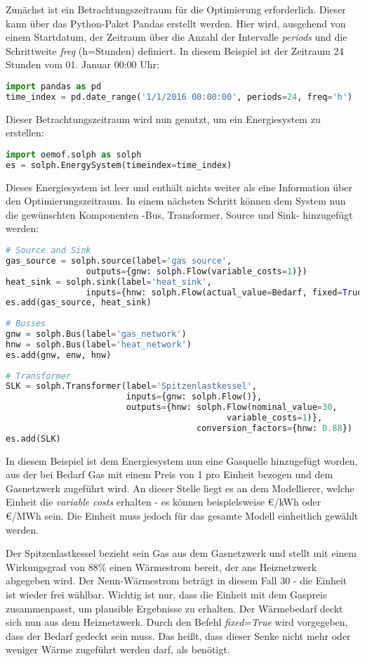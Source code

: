 Zunächst ist ein Betrachtungszeitraum für die Optimierung erforderlich. Dieser kann über das Python-Paket Pandas erstellt werden. Hier wird, ausgehend von einem Startdatum, der Zeitraum über die Anzahl der Intervalle \textit{periods} und die Schrittweite \textit{freq} (h=Stunden) definiert. In diesem Beispiel ist der Zeitraum 24 Stunden vom 01. Januar 00:00 Uhr:
\begin{lstlisting}[language=python,numbers=none]
import pandas as pd
time_index = pd.date_range('1/1/2016 00:00:00', periods=24, freq='h')
\end{lstlisting}
Dieser Betrachtungszeitraum wird nun genutzt, um ein Energiesystem zu erstellen:
\begin{lstlisting}[language=python,numbers=none]
import oemof.solph as solph
es = solph.EnergySystem(timeindex=time_index)
\end{lstlisting}
Dieses Energiesystem ist leer und enthält nichts weiter als eine Information über den Optimierungszeitraum. In einem nächsten Schritt können dem System nun die gewünschten Komponenten -Bus, Transformer, Source und Sink- hinzugefügt werden:
	\begin{lstlisting}[language=python,numbers=none]
# Source and Sink
gas_source = solph.source(label='gas source',
				outputs={gnw: solph.Flow(variable_costs=1)})
heat_sink = solph.sink(label='heat_sink',
				inputs={hnw: solph.Flow(actual_value=Bedarf, fixed=True)})					   
es.add(gas_source, heat_sink)
		
# Busses
gnw = solph.Bus(label='gas_network')
hnw = solph.Bus(label='heat_network')
es.add(gnw, enw, hnw)
	
# Transformer
SLK = solph.Transformer(label='Spitzenlastkessel',
						inputs={gnw: solph.Flow()},
						outputs={hnw: solph.Flow(nominal_value=30,
											variable_costs=1)},
		  							  conversion_factors={hnw: 0.88})
es.add(SLK)
\end{lstlisting}
In diesem Beispiel ist dem Energiesystem nun eine Gasquelle hinzugefügt worden, aus der bei Bedarf Gas mit einem Preis von 1 pro Einheit bezogen und dem Gasnetzwerk zugeführt wird. An dieser Stelle liegt es an dem Modellierer, welche Einheit die \textit{variable costs} erhalten - es können beispielsweise €/kWh oder €/MWh sein. Die Einheit muss jedoch für das gesamte Modell einheitlich gewählt werden.

Der Spitzenlastkessel bezieht sein Gas aus dem Gasnetzwerk und stellt mit einem Wirkungsgrad von 88\% einen Wärmestrom bereit, der ans Heiznetzwerk abgegeben wird. Der Nenn-Wärmestrom beträgt in diesem Fall 30 - die Einheit ist wieder frei wählbar. Wichtig ist nur, dass die Einheit mit dem Gaspreis zusammenpasst, um plausible Ergebnisse zu erhalten.  
Der Wärmebedarf deckt sich nun aus dem Heiznetzwerk. Durch den Befehl \textit{fixed=True} wird vorgegeben, dass der Bedarf gedeckt sein muss. Das heißt, dass dieser Senke nicht mehr oder weniger Wärme zugeführt werden darf, als benötigt.

